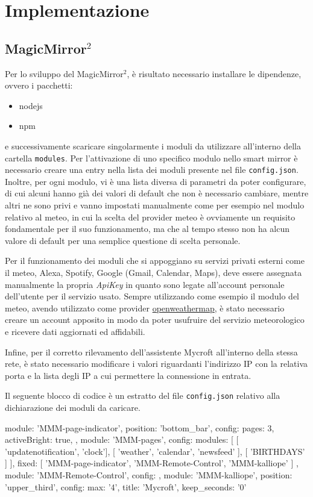 \documentclass[12pt,a4paper]{article}
\begin{document}
\newpage
\section{Implementazione}

\subsection{MagicMirror$^2$}\label{magicmirror}

Per lo sviluppo del MagicMirror$^2$, \`e risultato necessario installare le dipendenze, ovvero i pacchetti:
\begin{itemize}
  \item nodejs
  \item npm
\end{itemize}
e successivamente scaricare singolarmente i moduli da utilizzare all'interno della cartella \verb|modules|. Per l'attivazione
di uno specifico modulo nello smart mirror \`e necessario creare una entry nella lista dei moduli presente nel file
\verb|config.json|. Inoltre, per ogni modulo, vi \`e una lista diversa di parametri da poter configurare, di cui alcuni hanno
gi\`a dei valori di default che non \`e necessario cambiare, mentre altri ne sono privi e vanno impostati manualmente come per esempio
nel modulo relativo al meteo, in cui la scelta del provider meteo \`e ovviamente un requisito fondamentale per il suo funzionamento,
ma che al tempo stesso non ha alcun valore di default per una semplice questione di scelta personale.

Per il funzionamento dei moduli che si appoggiano su servizi privati esterni come il meteo, Alexa, Spotify, Google (Gmail,
Calendar, Maps), deve essere assegnata manualmente la propria \textit{ApiKey} in quanto sono legate all'account personale
dell'utente per il servizio usato. Sempre utilizzando come esempio il modulo del meteo, avendo utilizzato come provider
\href{https://openweathermap.org}{openweathermap}, \`e stato necessario creare un account apposito in modo da poter usufruire
del servizio meteorologico e ricevere dati aggiornati ed affidabili.

Infine, per il corretto rilevamento dell'assistente Mycroft all'interno della stessa rete, \`e stato necessario modificare
i valori riguardanti l'indirizzo IP con la relativa porta e la lista degli IP a cui permettere la connessione in entrata.

Il seguente blocco di codice \`e un estratto del file \verb|config.json| relativo alla dichiarazione dei moduli da caricare.
\begin{MyVerbatim}
{
  module: 'MMM-page-indicator',
  position: 'bottom_bar',
  config: {
    pages: 3,
    activeBright: true,
  }
},
{
  module: 'MMM-pages',
  config: {
     modules: [
      [ 'updatenotification', 'clock'],
      [ 'weather', 'calendar', 'newsfeed' ],
      [ 'BIRTHDAYS' ]
    ],
    fixed: [ 'MMM-page-indicator', 'MMM-Remote-Control', 'MMM-kalliope' ]
  }
},
{
  module: 'MMM-Remote-Control',
  config: {}
},
{
  module: 'MMM-kalliope',
  position: 'upper_third',
  config: {
    max: '4',
    title: 'Mycroft',
    keep_seconds: '0'
  }
}
\end{MyVerbatim}
\end{document}
